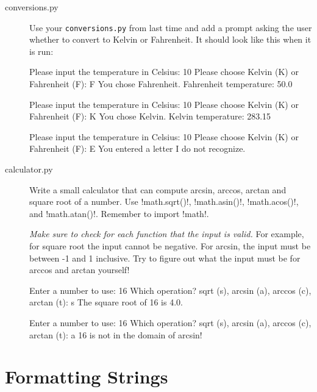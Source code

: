 \documentclass[11pt]{cselabheader}
\begin{document}
\begin{description}
  \item[conversions.py] Use your \texttt{conversions.py} from last time and add a
    prompt asking the user whether to convert to Kelvin or Fahrenheit. It should
    look like this when it is run:

    \begin{bashcode}
Please input the temperature in Celsius: 10
Please choose Kelvin (K) or Fahrenheit (F): F
You chose Fahrenheit.
Fahrenheit temperature: 50.0
    \end{bashcode}

    \begin{bashcode}
Please input the temperature in Celsius: 10
Please choose Kelvin (K) or Fahrenheit (F): K
You chose Kelvin.
Kelvin temperature: 283.15
    \end{bashcode}

    \begin{bashcode}
Please input the temperature in Celsius: 10
Please choose Kelvin (K) or Fahrenheit (F): E
You entered a letter I do not recognize.
    \end{bashcode}

  \item[calculator.py] Write a small calculator that can compute arcsin, arccos,
    arctan and square root of a number. Use \pythoninline!math.sqrt()!,
    \pythoninline!math.asin()!, \pythoninline!math.acos()!, and
    \pythoninline!math.atan()!. Remember to import \pythoninline!math!.

    \emph{Make sure to check for each function that the input is valid.} For
    example, for square root the input cannot be negative. For arcsin, the input
    must be between -1 and 1 inclusive. Try to figure out what the input must be
    for arccos and arctan yourself!

    \begin{bashcode}
Enter a number to use: 16
Which operation? sqrt (s), arcsin (a), arccos (c), arctan (t): s
The square root of 16 is 4.0.
    \end{bashcode}

    \begin{bashcode}
Enter a number to use: 16
Which operation? sqrt (s), arcsin (a), arccos (c), arctan (t): a
16 is not in the domain of arcsin!
    \end{bashcode}


\end{description}

\pagebreak
\section{Formatting Strings}
\end{document}
